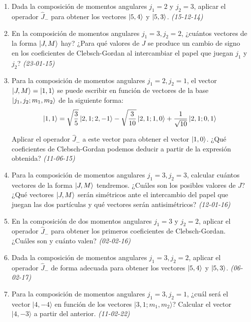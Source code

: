 \begin{enumerate}
    
    \item Dada la composición de momentos angulares \( j_1 = 2 \) y \( j_2 = 3 \), aplicar el operador \( \hat{J}_- \) para obtener los vectores \( \ket{5,4} \) y \( \ket{5,3} \). \textit{(15-12-14)}
    

    \item En la composición de momentos angulares \( j_1 = 3, j_2 = 2 \), ¿cuántos vectores de la forma \( \ket{J, M} \) hay? ¿Para qué valores de \( J \) se produce un cambio de signo en los coeficientes de Clebsch-Gordan al intercambiar el papel que juegan \( j_1 \) y \( j_2 \)? \textit{(23-01-15)}

    \item Para la composición de momentos angulares \( j_1 = 2, j_2 = 1 \), el vector \( \ket{J, M} = \ket{1,1} \) se puede escribir en función de vectores de la base \( \ket{j_1, j_2; m_1, m_2} \) de la siguiente forma:
    \[
    \ket{1,1} = \sqrt{\frac{3}{5}} \ket{2, 1; 2, -1} - \sqrt{\frac{3}{10}} \ket{2, 1; 1, 0} + \frac{1}{\sqrt{10}} \ket{2, 1; 0, 1}
    \]
    
    Aplicar el operador \( \hat{J}_- \) a este vector para obtener el vector \( \ket{1,0} \). ¿Qué coeficientes de Clebsch-Gordan podemos deducir a partir de la expresión obtenida? \textit{(11-06-15)}

    \item Para la composición de momentos angulares $j_1 = 3, j_2 = 3$, calcular cuántos vectores de la forma $\ket{J, M}$ tendremos. ¿Cuáles son los posibles valores de $J$? ¿Qué vectores $\ket{J, M}$ serán simétricos ante el intercambio del papel que juegan las dos partículas y qué vectores serán antisimétricos? \textit{(12-01-16)}

    \item En la composición de dos momentos angulares $j_1 = 3$ y $j_2 = 2$, aplicar el operador $\hat{J}_-$ para obtener los primeros coeficientes de Clebsch-Gordan. ¿Cuáles son y cuánto valen? \textit{(02-02-16)}
    
    \item Dada la composición de momentos angulares $j_1 = 3, j_2 = 2$, aplicar el operador $\hat{J}_-$ de forma adecuada para obtener los vectores $\ket{5,4}$ y $\ket{5,3}$. \textit{(06-02-17)}

    \item Para la composición de momentos angulares \( j_1 = 3, j_2 = 1 \), ¿cuál será el vector \(| 4, -4 \rangle\) en función de los vectores \(| 3, 1; m_1, m_2 \rangle\)? Calcular el vector \(| 4, -3 \rangle\) a partir del anterior. \textit{(11-02-22)}   
    


\end{enumerate}

